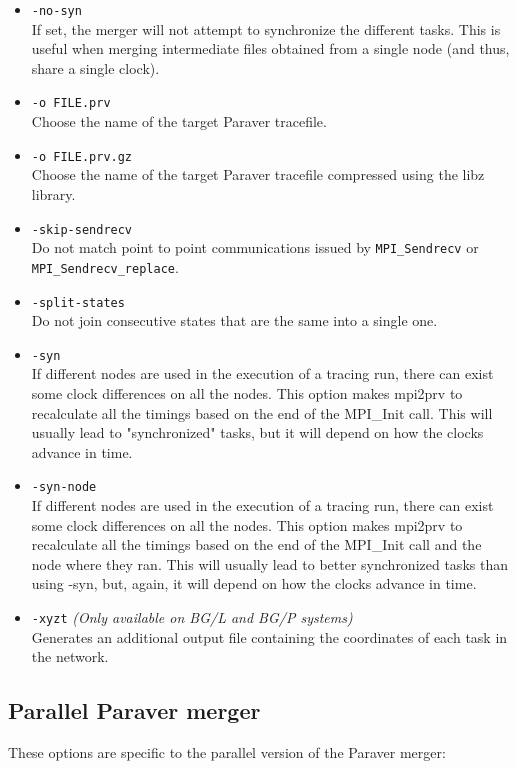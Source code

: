 \begin{itemize}
 \item {\tt -no-syn}\\
 If set, the merger will not attempt to synchronize the different tasks. This is useful when merging intermediate files obtained from a single node (and thus, share a single clock).
 \item {\tt -o FILE.prv}\\
 Choose the name of the target Paraver tracefile.
 \item {\tt -o FILE.prv.gz}\\
 Choose the name of the target Paraver tracefile compressed using the libz library.
 \item {\tt -skip-sendrecv}\\
 Do not match point to point communications issued by {\tt MPI\_Sendrecv} or {\tt MPI\_Sendrecv\_replace}.
 \item {\tt -split-states}\\
 Do not join consecutive states that are the same into a single one.
 \item {\tt -syn}\\
 If different nodes are used in the execution of a tracing run, there can exist some clock differences on all the nodes. This option makes mpi2prv to recalculate all the timings based on the end of the MPI\_Init call. This will usually lead to "synchronized" tasks, but it will depend on how the clocks advance in time.
 \item {\tt -syn-node}\\
 If different nodes are used in the execution of a tracing run, there can exist some clock differences on all the nodes. This option makes mpi2prv to recalculate all the timings based on the end of the MPI\_Init call and the node where they ran. This will usually lead to better synchronized tasks than using -syn, but, again, it will depend on how the clocks advance in time.
 \item {\tt -xyzt} {\em (Only available on BG/L and BG/P systems)}\\
 Generates an additional output file containing the coordinates of each task in the network.
\end{itemize}

\subsection{Parallel Paraver merger}

These options are specific to the parallel version of the Paraver merger:

